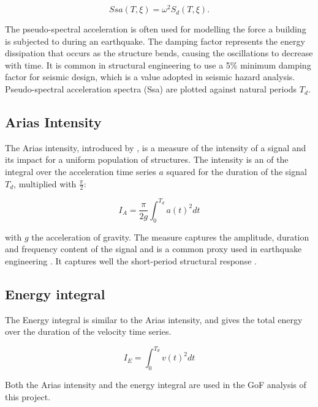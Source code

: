 \documentclass[../Text/00main.tex]{subfiles}
\begin{document}
\begin{equation}
    Ssa(T, \xi) = \omega^2 S_d(T, \xi).
\end{equation}

The pseudo-spectral acceleration is often used for modelling the force a building is subjected to during an earthquake. The damping factor represents the energy dissipation that occurs as the structure bends, causing the oscillations to decrease with time. It is common in structural engineering to use a 5\% minimum damping factor for seismic design, which is a value adopted in seismic hazard analysis. Pseudo-spectral acceleration spectra (Ssa) are plotted against natural periods $T_d$. 

\subsection{Arias Intensity}

The Arias intensity, introduced by \citet{arias1970measure}, is a measure of the intensity of a signal and its impact for a uniform population of structures. The intensity is an of the integral over the acceleration time series $a$ squared for the duration of the signal $T_d$, multiplied with  $\frac{\pi}{2}$:

\begin{equation}
    I_A = \frac{\pi}{2g} \int_0^{T_d} a(t)^2 dt
\end{equation}

with $g$ the acceleration of gravity. The measure captures the amplitude, duration and frequency content of the signal and is a common proxy used in earthquake engineering \citep{howard2008probabilistic}. It captures well the short-period structural response \citep{travasarou2003empirical}. 

\subsection{Energy integral}

The Energy integral is similar to the Arias intensity, and gives the total energy over the duration of the velocity time series. 

\begin{equation}
    I_E = \int_0^{T_d} v(t)^2 dt
\end{equation}

Both the Arias intensity and the energy integral are used in the GoF analysis of this project. 
\end{document}
